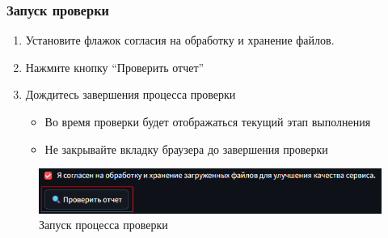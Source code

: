 \documentclass[a4paper,12pt]{article}
\begin{document}
\FloatBarrier
\begin{samepage}
\subsubsection{Запуск проверки}
\begin{enumerate}
    \item Установите флажок согласия на обработку и хранение файлов.
    
    \item Нажмите кнопку ``Проверить отчет''
    
    \item Дождитесь завершения процесса проверки 
    \begin{itemize}
        \item Во время проверки будет отображаться текущий этап выполнения
        \item Не закрывайте вкладку браузера до завершения проверки
    \end{itemize}
\end{enumerate}
\end{samepage}

\begin{figure}[!htb]
    \centering
    \includegraphics[width=\linewidth]{assets/check_start.png}
    \caption{Запуск процесса проверки}
\end{figure}
\end{document}
